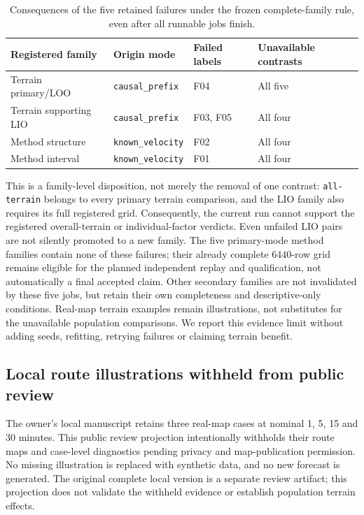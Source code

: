 \documentclass[11pt]{article}
\begin{document}
\begin{table}[htbp]
\centering\small
\caption{Consequences of the five retained failures under the frozen
complete-family rule, even after all runnable jobs finish.}
\label{tab:failure-family-dispositions}
\begin{tabular}{llll}
\toprule
Registered family & Origin mode & Failed labels & Unavailable contrasts\\
\midrule
Terrain primary/LOO & \texttt{causal\_prefix} & F04 & All five\\
Terrain supporting LIO & \texttt{causal\_prefix} & F03, F05 & All four\\
Method structure & \texttt{known\_velocity} & F02 & All four\\
Method interval & \texttt{known\_velocity} & F01 & All four\\
\bottomrule
\end{tabular}
\end{table}

This is a family-level disposition, not merely the removal of one contrast:
\texttt{all-terrain} belongs to every primary terrain comparison, and the
LIO family also requires its full registered grid. Consequently, the current
run cannot support the registered overall-terrain or individual-factor
verdicts. Even unfailed LIO pairs are not silently promoted to a new family.
The five primary-mode method families contain none of these failures;
their already complete 6440-row grid remains eligible for the planned
independent replay and qualification, not automatically a final accepted
claim. Other secondary families are not invalidated by these five jobs,
but retain their own completeness and descriptive-only conditions.
Real-map terrain examples remain illustrations, not substitutes for the
unavailable population comparisons. We report this evidence limit without
adding seeds, refitting, retrying failures or claiming terrain benefit.

\subsection{Local route illustrations withheld from public review}
\label{sec:case-horizons}
The owner's local manuscript retains three real-map cases at nominal
1, 5, 15 and 30 minutes. This public review projection intentionally
withholds their route maps and case-level diagnostics pending privacy and
map-publication permission. No missing illustration is replaced with
synthetic data, and no new forecast is generated. The original complete
local version is a separate review artifact; this projection does not
validate the withheld evidence or establish population terrain effects.
\end{document}
